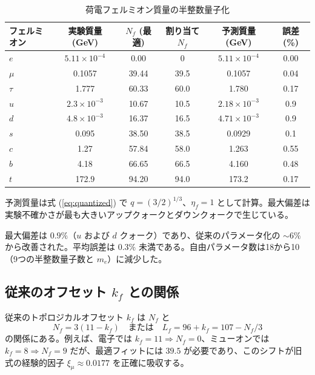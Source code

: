 \documentclass[12pt,a4paper]{article}
\begin{document}
	\begin{table}[htbp]
		\centering
		\caption{荷電フェルミオン質量の半整数量子化}
		\label{tab:masses}
		\begin{tabular}{l c c c c c}
			\toprule
			フェルミオン & 実験質量 (GeV) & \(N_f\) (最適) & 割り当て \(N_f\) & 予測質量 (GeV) & 誤差 (\%) \\
			\midrule
			\(e\)   & \(5.11\times10^{-4}\) & 0.00  & 0      & \(5.11\times10^{-4}\) & 0.00 \\
			\(\mu\)  & 0.1057                & 39.44 & 39.5   & 0.1057               & 0.04 \\
			\(\tau\) & 1.777                 & 60.33 & 60.0   & 1.780                & 0.17 \\
			\(u\)   & \(2.3\times10^{-3}\)    & 10.67 & 10.5   & \(2.18\times10^{-3}\)  & 0.9 \\
			\(d\)   & \(4.8\times10^{-3}\)    & 16.37 & 16.5   & \(4.71\times10^{-3}\)  & 0.9 \\
			\(s\)   & 0.095                 & 38.50 & 38.5   & 0.0929               & 0.1 \\
			\(c\)   & 1.27                  & 57.84 & 58.0   & 1.263                & 0.55 \\
			\(b\)   & 4.18                  & 66.65 & 66.5   & 4.160                & 0.48 \\
			\(t\)   & 172.9                 & 94.20 & 94.0   & 173.2                & 0.17 \\
			\bottomrule
		\end{tabular}
		\par\smallskip
		\footnotesize 予測質量は式 (\ref{eq:quantized}) で \(q = (3/2)^{1/3}\)、\(\eta_f = 1\) として計算。最大偏差は実験不確かさが最も大きいアップクォークとダウンクォークで生じている。
	\end{table}
	
	最大偏差は \(0.9\%\)（\(u\) および \(d\) クォーク）であり、従来のパラメータ化の \(\sim 6\%\) から改善された。平均誤差は \(0.3\%\) 未満である。自由パラメータ数は18から10（9つの半整数量子数と \(m_e\)）に減少した。
	
	\subsection{従来のオフセット \(k_f\) との関係}
	
	従来のトポロジカルオフセット \(k_f\) は \(N_f\) と
	\begin{equation}
		N_f = 3(11 - k_f) \quad \text{または} \quad L_f = 96 + k_f = 107 - N_f/3
	\end{equation}
	の関係にある。例えば、電子では \(k_f = 11 \Rightarrow N_f = 0\)、ミューオンでは \(k_f = 8 \Rightarrow N_f = 9\) だが、最適フィットには \(39.5\) が必要であり、このシフトが旧式の経験的因子 \(\xi_\mu \approx 0.0177\) を正確に吸収する。
	
\end{document}
